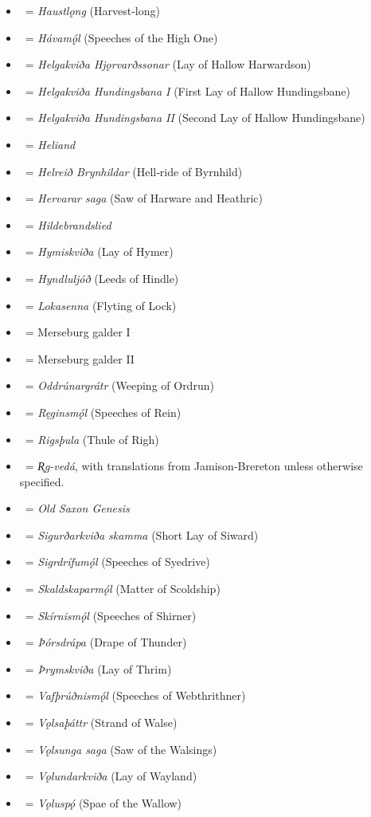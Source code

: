 \begin{itemize}
	\item \Haustlong\ = \emph{Haustlǫng} (Harvest‑long)
	\item \Havamal\ = \emph{Hávamǫ́l} (Speeches of the High One)
	\item \HelgakvidaHjorvardssonar\ = \emph{Helgakviða Hjǫrvarðssonar} (Lay of Hallow Harwardson)
	\item \HelgakvidaOne\ = \emph{Helgakviða Hundingsbana I} (First Lay of Hallow Hundingsbane)
	\item \HelgakvidaTwo\ = \emph{Helgakviða Hundingsbana II} (Second Lay of Hallow Hundingsbane)
	\item \Heliand\ = \emph{Heliand}
	\item \Helreid\ = \emph{Helreið Brynhildar} (Hell‑ride of Byrnhild)
	\item \HervararSaga\ = \emph{Hervarar saga} (Saw of Harware and Heathric)
	\item \Hildebrandslied\ = \emph{Hildebrandslied}
	\item \Hymiskvida\ = \emph{Hymiskviða} (Lay of Hymer)
	\item \Hyndluljod\ = \emph{Hyndluljóð} (Leeds of Hindle)
	\item \Lokasenna\ = \emph{Lokasenna} (Flyting of Lock)
	\item \MerseburgOne\ = Merseburg galder I
	\item \MerseburgTwo\ = Merseburg galder II
	\item \Oddrunargratr\ = \emph{Oddrúnargrátr} (Weeping of Ordrun)
	\item \Reginsmal\ = \emph{Ręginsmǫ́l} (Speeches of Rein)
	\item \Rigsthula\ = \emph{Rigsþula} (Thule of Righ)
	\item \Rigveda\ = \emph{R̥g-vedá}, with translations from Jamison‑Brereton unless otherwise specified.
	\item \SaxonGenesis\ = \emph{Old Saxon Genesis}
	\item \Sigurdskamma\ = \emph{Sigurðarkviða skamma} (Short Lay of Siward)
	\item \Sigrdrifumal\ = \emph{Sigrdrífumǫ́l} (Speeches of Syedrive)
	\item \Skaldskaparmal\ = \emph{Skaldskaparmǫ́l} (Matter of Scoldship)
	\item \Skirnismal\ = \emph{Skírnismǫ́l} (Speeches of Shirner)
	\item \Thorsdrapa\ = \emph{Þórsdrápa} (Drape of Thunder)
	\item \Thrymskvida\ = \emph{Þrymskviða} (Lay of Thrim)
	\item \Vafthrudnismal\ = \emph{Vafþrúðnismǫ́l} (Speeches of Webthrithner)
	\item \Volsathattr\ = \emph{Vǫlsaþáttr} (Strand of Walse)
	\item \VolsungaSaga\ = \emph{Vǫlsunga saga} (Saw of the Walsings)
	\item \Volundarkvida\ = \emph{Vǫlundarkviða} (Lay of Wayland)
	\item \Voluspa\ = \emph{Vǫluspǫ́} (Spae of the Wallow)
\end{itemize}%


